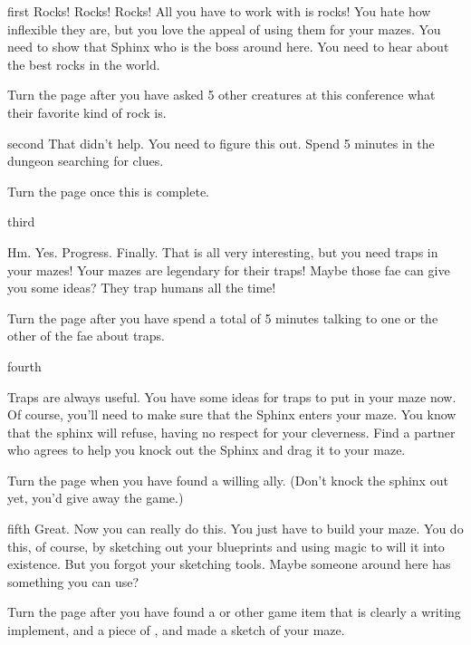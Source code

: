 \documentclass[notebook]{guildcamp2} %
\begin{document}
\startnotebook{\nmazeterpiece{}}

\begin{page}{first}
Rocks! Rocks! Rocks! All you have to work with is rocks! You hate how inflexible they are, but you love the appeal of using them for your mazes.
You need to show that Sphinx who is the boss around here. You need to hear about the best rocks in the world.

Turn the page after you have asked 5 other creatures at this conference what their favorite kind of rock is.
\end{page}

\begin{page}{second}
That didn't help. You need to figure this out. Spend 5 minutes in the dungeon searching for clues.

Turn the page once this is complete.
\end{page}

\begin{page}{third}

Hm. Yes. Progress. Finally. That is all very interesting, but you need traps in your mazes! Your mazes are legendary for their traps! Maybe those fae can give you some ideas? They trap humans all the time!

Turn the page after you have spend a total of 5 minutes talking to one or the other of the fae about traps.
\end{page}

\begin{page}{fourth}

Traps are always useful. You have some ideas for traps to put in your maze now.  Of course, you'll need to make sure that the Sphinx enters your maze. You know that the sphinx will refuse, having no respect for your cleverness. Find a partner who agrees to help you knock out the Sphinx and drag it to your maze.

Turn the page when you have found a willing ally. (Don't knock the sphinx out yet, you'd give away the game.)
\end{page}

\begin{page}{fifth}
Great. Now you can really do this. You just have to build your maze. You do this, of course, by sketching out your blueprints and using magic to will it into existence. But you forgot your sketching tools. Maybe someone around here has something you can use?

Turn the page after you have found a \iQuill{} or other game item that is clearly a writing implement, and a piece of \iPaper{}, and made a sketch of your maze.
\end{page}
\end{document}
